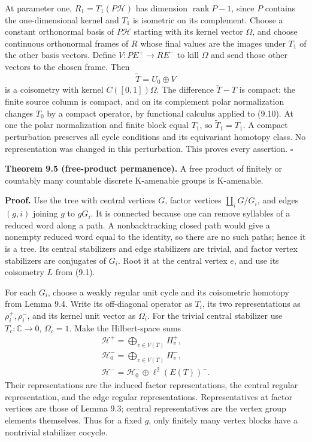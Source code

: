\documentclass[
  11pt,
]{article}
\begin{document}
At parameter one, \(R_1=T_1(P\mathcal H)\) has dimension
\(\operatorname{rank}P-1\), since \(P\) contains the one-dimensional
kernel and \(T_1\) is isometric on its complement. Choose a constant
orthonormal basis of \(P\mathcal H\) starting with its kernel vector
\(\Omega\), and choose continuous orthonormal frames of \(R\) whose
final values are the images under \(T_1\) of the other basis vectors.
Define \(V:P E^+\to R E^-\) to kill \(\Omega\) and send those other
vectors to the chosen frame. Then \[
\widetilde T=U_0\oplus V
\tag{9.13}
\] is a coisometry with kernel \(C([0,1])\Omega\). The difference
\(\widetilde T-T\) is compact: the finite source column is compact, and
on its complement polar normalization changes \(T_0\) by a compact
operator, by functional calculus applied to (9.10). At one the polar
normalization and finite block equal \(T_1\), so \(\widetilde T_1=T_1\).
A compact perturbation preserves all cycle conditions and its
equivariant homotopy class. No representation was changed in this
perturbation. This proves every assertion. \(\square\)

\textbf{Theorem 9.5 (free-product permanence).} A free product of
finitely or countably many countable discrete K-amenable groups is
K-amenable.

\textbf{Proof.} Use the tree with central vertices \(G\), factor
vertices \(\coprod_iG/G_i\), and edges \((g,i)\) joining \(g\) to
\(gG_i\). It is connected because one can remove syllables of a reduced
word along a path. A nonbacktracking closed path would give a nonempty
reduced word equal to the identity, so there are no such paths; hence it
is a tree. Its central stabilizers and edge stabilizers are trivial, and
factor vertex stabilizers are conjugates of \(G_i\). Root it at the
central vertex \(e\), and use its coisometry \(L\) from (9.1).

For each \(G_i\), choose a weakly regular unit cycle and its coisometric
homotopy from Lemma 9.4. Write its off-diagonal operator as \(T_i\), its
two representations as \(\rho_i^+,\rho_i^-\), and its kernel unit vector
as \(\Omega_i\). For the trivial central stabilizer use
\(T_c:\mathbb C\to0\), \(\Omega_c=1\). Make the Hilbert-space sums \[
\begin{gathered}
\mathscr H^+=\bigoplus_{v\in V(T)} H_v^+,\\
\mathscr H_0^-=\bigoplus_{v\in V(T)}H_v^-,\\
\mathscr H^-=\mathscr H_0^-
 \oplus\ell^2(E(T))^-.
\end{gathered}
\tag{9.14}
\] Their representations are the induced factor representations, the
central regular representation, and the edge regular representations.
Representatives at factor vertices are those of Lemma 9.3; central
representatives are the vertex group elements themselves. Thus for a
fixed \(g\), only finitely many vertex blocks have a nontrivial
stabilizer cocycle.
\end{document}
